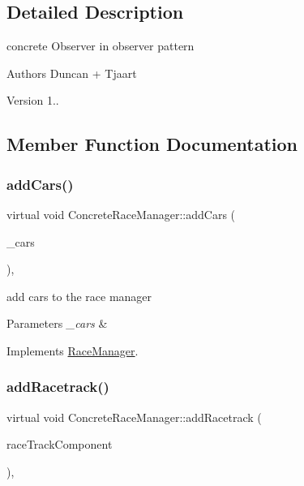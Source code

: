 \subsection{Detailed Description}
concrete Observer in observer pattern 

\begin{DoxyAuthor}{Authors}
Duncan + Tjaart 
\end{DoxyAuthor}
\begin{DoxyVersion}{Version}
1.. 
\end{DoxyVersion}


\subsection{Member Function Documentation}
\mbox{\label{class_concrete_race_manager_af66dfe4faeefa1c5011cc6f64fec967e}} 
\subsubsection{\texorpdfstring{add\+Cars()}{addCars()}}
{\footnotesize\ttfamily virtual void Concrete\+Race\+Manager\+::add\+Cars (\begin{DoxyParamCaption}\item[{vector$<$ \mbox{\hyperlink{class_car}{Car}} $\ast$$>$}]{\+\_\+cars }\end{DoxyParamCaption})\hspace{0.3cm}{\ttfamily [inline]}, {\ttfamily [virtual]}}

add cars to the race manager 
\begin{DoxyParams}{Parameters}
{\em \+\_\+cars} & \\
\hline
\end{DoxyParams}


Implements \mbox{\hyperlink{class_race_manager_a96b19bc745ac837db71d71e3a2925ce8}{Race\+Manager}}.

\mbox{\label{class_concrete_race_manager_ab6953cc9a9930e4e0af231f125f8f223}} 
\subsubsection{\texorpdfstring{add\+Racetrack()}{addRacetrack()}}
{\footnotesize\ttfamily virtual void Concrete\+Race\+Manager\+::add\+Racetrack (\begin{DoxyParamCaption}\item[{\mbox{\hyperlink{class_race_track_component}{Race\+Track\+Component}} $\ast$}]{race\+Track\+Component }\end{DoxyParamCaption})\hspace{0.3cm}{\ttfamily [inline]}, {\ttfamily [virtual]}}

